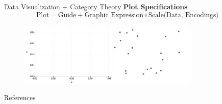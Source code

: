 \documentclass[aspectratio=169,xcolor=dvipsnames,10pt]{beamer}
\theoremstyle{definition}
\begin{document}
\begin{frame}[fragile]{Data Visualization + Category Theory}
    \textbf{Plot Specifications}
    $$\text{Plot} = \text{Guide} + \text{Graphic Expression} \circ \text{Scale(Data, Encodings)}$$
  \begin{figure}
    \begin{center}
        \includegraphics[width=0.8\textwidth]{./figs/frame_graphic.pdf}
    \end{center}
  \end{figure}
\end{frame}

\begin{frame}{References}
    \footnotesize
    
    
\end{frame}



\end{document}
